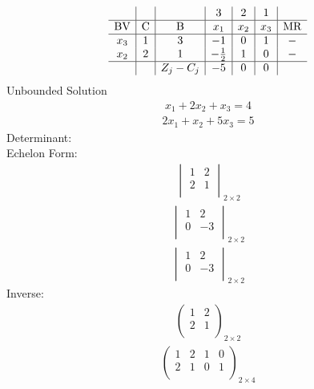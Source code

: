\documentclass{article}
\begin{document}
\begin{align*}
\begin{array}{c|c|c|c|c|c|c}
 &  &  & 3 & 2 & 1 & \\
\hline
\text{BV} & \text{C} & \text{B} & x_{1} & x_{2} & x_{3} & \text{MR} \\
\hline
x_{3} & 1 & 3 & -1 & 0 & 1 & - \\
x_{2} & 2 & 1 & -\frac{1}{2} & 1 & 0 & - \\
\hline
 &  & Z_j-C_j & -5 & 0 & 0 & \\
\end{array}
\end{align*}
Unbounded Solution\\
\begin{align*}
x_{1} + 2x_{2} + x_{3}=4\end{align*}
\begin{align*}
2x_{1} + x_{2} + 5x_{3}=5\end{align*}
Determinant:\\
Echelon Form:\\
\begin{align*}
\begin{vmatrix}
1 & 2\\
2 & 1\\
\end{vmatrix}_{2\times 2}
\end{align*}
\begin{align*}
\begin{vmatrix}
1 & 2\\
0 & -3\\
\end{vmatrix}_{2\times 2}
\end{align*}
\begin{align*}
\begin{vmatrix}
1 & 2\\
0 & -3\\
\end{vmatrix}_{2\times 2}
\end{align*}
Inverse:\\
\begin{align*}
\begin{pmatrix}
1 & 2\\
2 & 1\\
\end{pmatrix}_{2\times 2}
\end{align*}
\begin{align*}
\left(
\begin{array}{cc|cc}
1 & 2 & 1 & 0\\
2 & 1 & 0 & 1\\
\end{array}
\right)_{2\times 4}
\end{align*}
\end{document}
